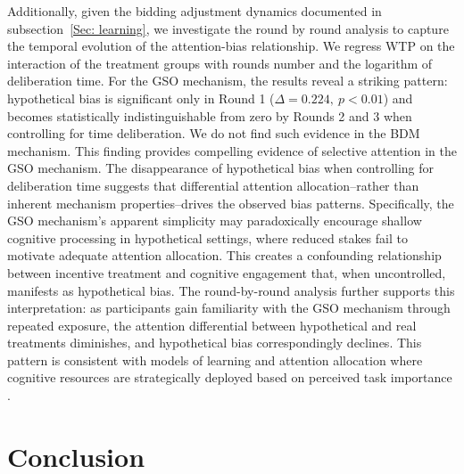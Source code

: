 \documentclass[12pt]{article}
\begin{document}
Additionally, given the bidding adjustment dynamics documented in subsection~\ref{Sec: learning}, we investigate the round by round analysis to capture the temporal evolution of the attention-bias relationship. We regress WTP on the interaction of the treatment groups with rounds number and the logarithm of deliberation time. For the GSO mechanism, the results reveal a striking pattern: hypothetical bias is significant only in Round 1 (\(\Delta = 0.224, \ p < 0.01\)) and becomes statistically indistinguishable from zero by Rounds 2 and 3 when controlling for time deliberation. We do not find such evidence in the BDM mechanism.
This finding provides compelling evidence of  selective attention in the GSO mechanism. The disappearance of hypothetical bias when controlling for deliberation time suggests that differential attention allocation--rather than inherent mechanism properties--drives the observed bias patterns. Specifically, the GSO mechanism's apparent simplicity may paradoxically encourage shallow cognitive processing in hypothetical settings, where reduced stakes fail to motivate adequate attention allocation. This creates a confounding relationship between incentive treatment and cognitive engagement that, when uncontrolled, manifests as hypothetical bias.
The round-by-round analysis further supports this interpretation: as participants gain familiarity with the GSO mechanism through repeated exposure, the attention differential between hypothetical and real treatments diminishes, and hypothetical bias correspondingly declines. This pattern is consistent with models of learning and attention allocation where cognitive resources are strategically deployed based on perceived task importance \citep{gabaix2019behavioral}.









\section{Conclusion}
\label{Conclusion}
\end{document}
